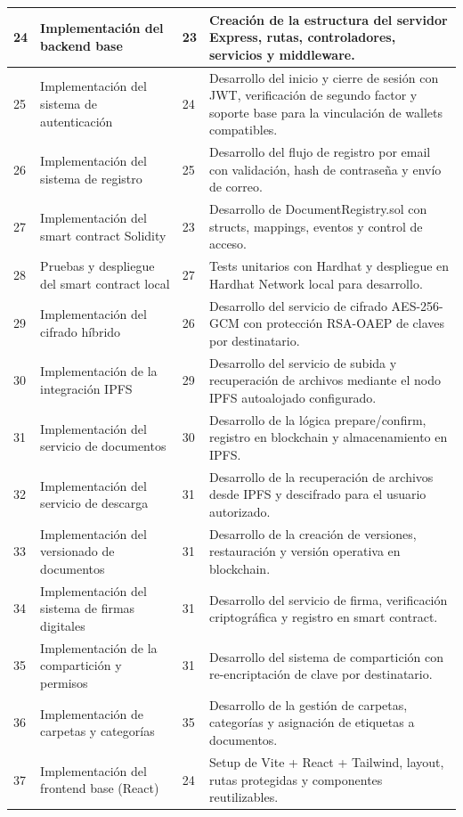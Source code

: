 \documentclass[11pt, a4paper]{article}
\begin{document}
\begin{longtable}{|p{1cm}|p{5.5cm}|p{1.5cm}|p{5.5cm}|}
\hline
24 & Implementación del backend base & 23 & Creación de la estructura del servidor Express, rutas, controladores, servicios y middleware. \\
\hline
25 & Implementación del sistema de autenticación & 24 & Desarrollo del inicio y cierre de sesión con JWT, verificación de segundo factor y soporte base para la vinculación de wallets compatibles. \\
\hline
26 & Implementación del sistema de registro & 25 & Desarrollo del flujo de registro por email con validación, hash de contraseña y envío de correo. \\
\hline
27 & Implementación del smart contract Solidity & 23 & Desarrollo de DocumentRegistry.sol con structs, mappings, eventos y control de acceso. \\
\hline
28 & Pruebas y despliegue del smart contract local & 27 & Tests unitarios con Hardhat y despliegue en Hardhat Network local para desarrollo. \\
\hline
29 & Implementación del cifrado híbrido & 26 & Desarrollo del servicio de cifrado AES-256-GCM con protección RSA-OAEP de claves por destinatario. \\
\hline
30 & Implementación de la integración IPFS & 29 & Desarrollo del servicio de subida y recuperación de archivos mediante el nodo IPFS autoalojado configurado. \\
\hline
31 & Implementación del servicio de documentos & 30 & Desarrollo de la lógica prepare/confirm, registro en blockchain y almacenamiento en IPFS. \\
\hline
32 & Implementación del servicio de descarga & 31 & Desarrollo de la recuperación de archivos desde IPFS y descifrado para el usuario autorizado. \\
\hline
33 & Implementación del versionado de documentos & 31 & Desarrollo de la creación de versiones, restauración y versión operativa en blockchain. \\
\hline
34 & Implementación del sistema de firmas digitales & 31 & Desarrollo del servicio de firma, verificación criptográfica y registro en smart contract. \\
\hline
35 & Implementación de la compartición y permisos & 31 & Desarrollo del sistema de compartición con re-encriptación de clave por destinatario. \\
\hline
36 & Implementación de carpetas y categorías & 35 & Desarrollo de la gestión de carpetas, categorías y asignación de etiquetas a documentos. \\
\hline
37 & Implementación del frontend base (React) & 24 & Setup de Vite + React + Tailwind, layout, rutas protegidas y componentes reutilizables. \\

\end{longtable}
\end{document}
